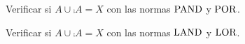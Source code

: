 Verificar si \(A ∪ \comp{A} = X\)
con las normas \(\operatorname{PAND}\) y \(\operatorname{POR}\).

Verificar si \(A ∪ \comp{A} = X\)
con las normas \(\operatorname{LAND}\) y \(\operatorname{LOR}\).

